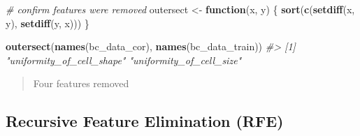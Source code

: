 \documentclass[]{book}
\newenvironment{Shaded}{\begin{snugshade}}{\end{snugshade}}
\newcommand{\CommentTok}[1]{\textcolor[rgb]{0.56,0.35,0.01}{\textit{#1}}}
\newcommand{\ControlFlowTok}[1]{\textcolor[rgb]{0.13,0.29,0.53}{\textbf{#1}}}
\newcommand{\KeywordTok}[1]{\textcolor[rgb]{0.13,0.29,0.53}{\textbf{#1}}}
\newcommand{\NormalTok}[1]{#1}
\newcommand{\OperatorTok}[1]{\textcolor[rgb]{0.81,0.36,0.00}{\textbf{#1}}}
\newcommand{\StringTok}[1]{\textcolor[rgb]{0.31,0.60,0.02}{#1}}
\begin{document}
\begin{Shaded}
\end{Shaded}

\begin{Shaded}
\begin{Highlighting}[]
\CommentTok{# confirm features were removed}
\NormalTok{outersect <-}\StringTok{ }\ControlFlowTok{function}\NormalTok{(x, y) \{}
  \KeywordTok{sort}\NormalTok{(}\KeywordTok{c}\NormalTok{(}\KeywordTok{setdiff}\NormalTok{(x, y),}
         \KeywordTok{setdiff}\NormalTok{(y, x)))}
\NormalTok{\}}
 
\KeywordTok{outersect}\NormalTok{(}\KeywordTok{names}\NormalTok{(bc_data_cor), }\KeywordTok{names}\NormalTok{(bc_data_train))}
\CommentTok{#> [1] "uniformity_of_cell_shape" "uniformity_of_cell_size"}
\end{Highlighting}
\end{Shaded}

\begin{quote}
Four features removed
\end{quote}

\hypertarget{recursive-feature-elimination-rfe}{%
\subsection{Recursive Feature Elimination (RFE)}\label{recursive-feature-elimination-rfe}}
\end{document}
